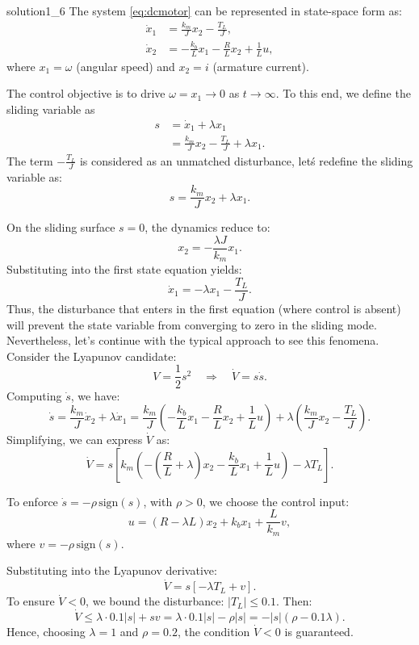 \begin{solution}{}{solution1_6}
	The system \eqref{eq:dcmotor} can be represented in state-space form as:
	\[
		\begin{aligned}
			\dot{x}_1 & = \frac{k_m}{J} x_2 - \frac{T_L}{J}, \\
			\dot{x}_2 & = -\frac{k_b}{L} x_1 - \frac{R}{L} x_2 + \frac{1}{L} u,
		\end{aligned}
	\]
	where \( x_1 = \omega \) (angular speed) and \( x_2 = i \) (armature current).

	The control objective is to drive \( \omega = x_1 \to 0 \) as \( t \to \infty \). To this end, we define the sliding variable as
	\[
		\begin{aligned}
			s & = \dot{x}_1 + \lambda x_1 \\
			  & = \frac{k_m}{J} x_2 - \frac{T_L}{J} + \lambda x_1.
		\end{aligned}
	\]
	The term \( -\frac{T_L}{J} \) is considered as an unmatched disturbance, letś redefine the sliding variable as:
	\[
		s = \frac{k_m}{J} x_2 + \lambda x_1.
	\]

	On the sliding surface \( s = 0 \), the dynamics reduce to:
	\[
		x_2 = -\frac{\lambda J}{k_m} x_1.
	\]
	Substituting into the first state equation yields:
	\[
		\dot{x}_1 = -\lambda x_1 - \frac{T_L}{J}.
	\]
    Thus, the disturbance that enters in the first equation (where control is absent) will prevent the state variable from converging to zero in the sliding mode. Nevertheless, let's continue with the typical approach to see this fenomena.\\

	Consider the Lyapunov candidate:
	\[
		V = \frac{1}{2} s^2 \quad \Rightarrow \quad \dot{V} = s \dot{s}.
	\]
	Computing \( \dot{s} \), we have:
	\[
		\dot{s} = \frac{k_m}{J} \dot{x}_2 + \lambda \dot{x}_1 = \frac{k_m}{J} \left( -\frac{k_b}{L} x_1 - \frac{R}{L} x_2 + \frac{1}{L} u \right) + \lambda \left( \frac{k_m}{J} x_2 - \frac{T_L}{J} \right).
	\]
	Simplifying, we can express \( \dot{V} \) as:
	\[
		\dot{V} = s \left[ k_m \left( -\left(\frac{R}{L} + \lambda \right) x_2 - \frac{k_b}{L} x_1 + \frac{1}{L} u \right) - \lambda T_L \right].
	\]

	To enforce \( \dot{s} = -\rho\, \text{sign}(s) \), with \( \rho > 0 \), we choose the control input:
	\[
		u = (R - \lambda L) x_2 + k_b x_1 + \frac{L}{k_m} v,
	\]
	where \( v = -\rho\, \text{sign}(s) \).

	Substituting into the Lyapunov derivative:
	\[
		\dot{V} = s \left[ -\lambda T_L + v \right].
	\]
	To ensure \( \dot{V} < 0 \), we bound the disturbance: \( |T_L| \leq 0.1 \). Then:
	\[
		\dot{V} \leq \lambda \cdot 0.1 |s| + s v = \lambda \cdot 0.1 |s| - \rho |s| = -|s|(\rho - 0.1\lambda).
	\]
	Hence, choosing \( \lambda = 1 \) and \( \rho = 0.2 \), the condition \( \dot{V} < 0 \) is guaranteed.\\


\end{solution}
